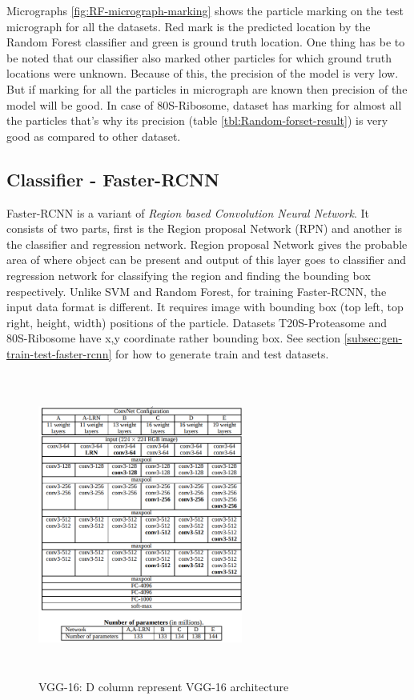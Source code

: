 \documentclass[twoside]{iitbreport}
\begin{document}
Micrographs \ref{fig:RF-micrograph-marking} shows the particle marking on the test micrograph for all the datasets. Red mark is the predicted location by the Random Forest classifier and green is ground truth location. One thing has be to be noted that our classifier also marked other particles for which ground truth locations were unknown. Because of this, the precision of the model is very low. But if marking for all the particles in micrograph are known then precision of the model will be good. In case of 80S-Ribosome, dataset has marking for almost all the particles that's why its precision (table \ref{tbl:Random-forset-result}) is very good as compared to other dataset.


\subsection{Classifier - Faster-RCNN}
Faster-RCNN is a variant of \textit{Region based Convolution Neural Network}. It consists of two parts, first is the Region proposal Network (RPN) and  another is the classifier and regression network. Region proposal Network gives the probable area of where object can be present and output of this layer goes to classifier and regression network for classifying the region and finding the bounding box respectively. Unlike SVM and Random Forest, for training Faster-RCNN, the input data format is different. It requires image with bounding box (top left, top right, height, width) positions of the particle. Datasets T20S-Proteasome and 80S-Ribosome have x,y coordinate rather bounding box. See section \ref{subsec:gen-train-test-faster-rcnn} for how to generate train and test datasets.

\begin{figure}[H]
\includegraphics[width=0.6\textwidth,height=10cm]{vgg16_arch.png}
\centering
\captionsetup{justification=centering}
\caption{VGG-16: D column represent VGG-16 architecture}
\label{fig:fastercnn-vgg16-arch}
\end{figure}
\end{document}

